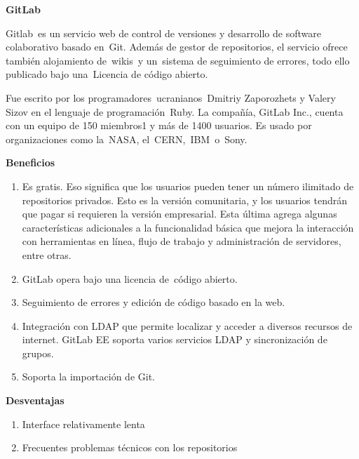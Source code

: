 \documentclass{article} %
\begin{document}
\noindent 

\noindent \textbf{GitLab}

\noindent Gitlab~es un servicio web de control de versiones y desarrollo de software colaborativo basado en~Git. Adem\'{a}s de gestor de repositorios, el servicio ofrece tambi\'{e}n alojamiento de~wikis~y un~sistema de seguimiento de errores, todo ello publicado bajo una~Licencia de c\'{o}digo abierto.

\noindent Fue escrito por los programadores~ucranianos~Dmitriy Zaporozhets y Valery Sizov en el lenguaje de programaci\'{o}n~Ruby. La compa\~{n}\'{i}a, GitLab Inc., cuenta con un equipo de 150 miembros1 y m\'{a}s de 1400 usuarios. {} Es usado por organizaciones como la~NASA, el~CERN,~IBM~o~Sony.

\noindent \textbf{Beneficios}

\begin{enumerate}
\item \textbf{ }Es gratis. Eso significa que los usuarios pueden tener un n\'{u}mero ilimitado de repositorios privados. Esto es la versi\'{o}n comunitaria, y los usuarios tendr\'{a}n que pagar si requieren la versi\'{o}n empresarial. Esta \'{u}ltima agrega algunas caracter\'{i}sticas adicionales a la funcionalidad b\'{a}sica que mejora la interacci\'{o}n con herramientas en l\'{i}nea, flujo de trabajo y administraci\'{o}n de servidores, entre otras.

\item  GitLab opera bajo una licencia de~c\'{o}digo abierto.

\item  Seguimiento de errores y edici\'{o}n de c\'{o}digo basado en la web.

\item  Integraci\'{o}n con LDAP que permite localizar y acceder a diversos recursos de internet. GitLab EE soporta varios servicios LDAP y sincronizaci\'{o}n de grupos.

\item  Soporta la importaci\'{o}n de Git.
\end{enumerate}

\noindent \textbf{Desventajas}

\begin{enumerate}
\item \textbf{ }Interface relativamente lenta

\item  Frecuentes problemas t\'{e}cnicos con los repositorios
\end{enumerate}
\end{document}
